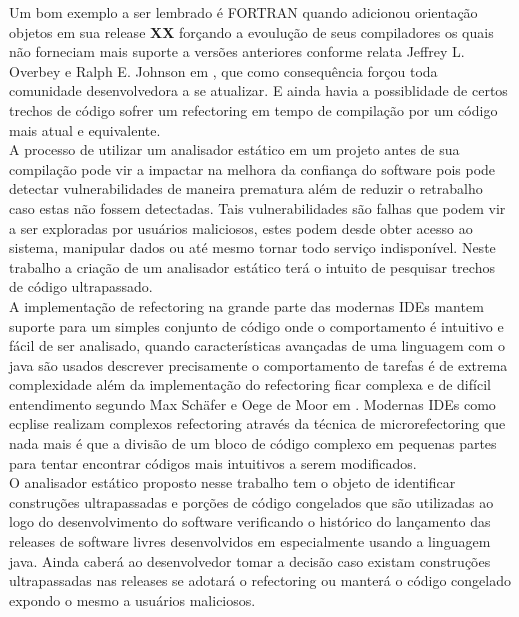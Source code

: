 Um bom exemplo a ser lembrado é FORTRAN quando adicionou orientação objetos em sua release \textbf{XX} forçando a evoulução de seus compiladores os quais não forneciam mais suporte a versões anteriores conforme relata Jeffrey L. Overbey e Ralph E. Johnson em \cite{Overbey:2009:RLR:1639949.1640127}, que como consequência forçou toda comunidade desenvolvedora a se atualizar. E ainda havia a possiblidade de certos trechos de código sofrer um refectoring em tempo de compilação por um código mais atual e equivalente.\\

A processo de utilizar um analisador estático em um projeto antes de sua compilação pode vir a impactar na melhora da confiança do software pois pode detectar vulnerabilidades de maneira prematura além de reduzir o retrabalho caso estas não fossem detectadas. Tais vulnerabilidades são falhas que podem vir a ser exploradas por usuários maliciosos, estes podem desde obter acesso ao sistema, manipular dados ou até mesmo tornar todo serviço indisponível. Neste trabalho a criação de um analisador estático terá o intuito de pesquisar trechos de código ultrapassado.\\

A implementação de refectoring na grande parte das modernas IDEs mantem suporte para um simples conjunto de código onde o comportamento é intuitivo e fácil de ser analisado,  quando características avançadas de uma linguagem com o java são usados descrever precisamente o comportamento de tarefas é de extrema complexidade além da implementação do refectoring ficar complexa e de difícil entendimento segundo Max Schäfer e Oege de Moor em \cite{Schaefer:2010:SIR:1932682.1869485}. Modernas IDEs como ecplise realizam complexos refectoring através da técnica de microrefectoring que nada mais é que a divisão de um bloco de código complexo em pequenas partes para tentar encontrar códigos mais intuitivos a serem modificados.\\

O analisador estático proposto nesse trabalho tem o objeto de identificar construções ultrapassadas e porções de código congelados que são utilizadas ao logo do desenvolvimento do software verificando o histórico do lançamento das releases de software livres desenvolvidos em especialmente usando a linguagem java. Ainda caberá ao desenvolvedor tomar a decisão caso existam construções ultrapassadas nas releases se adotará o refectoring ou manterá o código congelado expondo o mesmo a usuários maliciosos.\\




